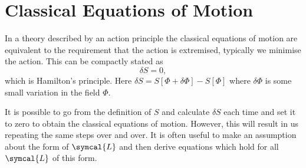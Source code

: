 \documentclass[fleqn]{NotesClass}
\newcommand{\lagrangianDensity}{\symcal{L}}
\begin{document}
    \section{Classical Equations of Motion}
    In a theory described by an action principle the classical equations of motion are equivalent to the requirement that the action is extremised, typically we minimise the action.
    This can be compactly stated as
    \begin{equation}
        \delta S = 0,
    \end{equation}
    which is Hamilton's principle.
    Here \(\delta S = S[\Phi + \delta \Phi] - S[\Phi]\) where \(\delta \Phi\) is some small variation in the field \(\Phi\).
    
    It is possible to go from the definition of \(S\) and calculate \(\delta S\) each time and set it to zero to obtain the classical equations of motion.
    However, this will result in us repeating the same steps over and over.
    It is often useful to make an assumption about the form of \(\lagrangianDensity\) and then derive equations which hold for all \(\lagrangianDensity\) of this form.
    
\end{document}
